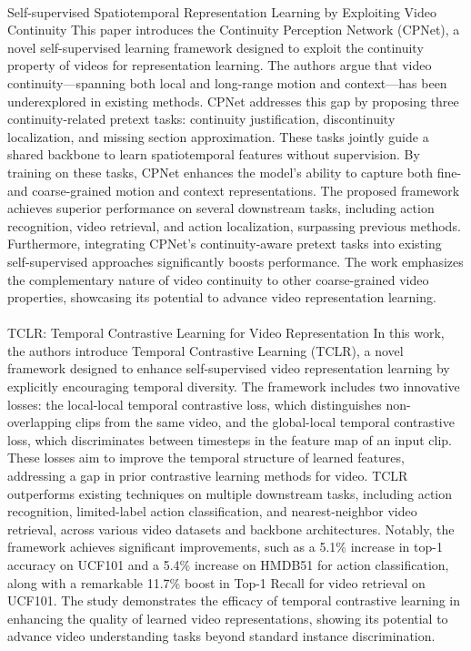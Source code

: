 \documentclass[11pt,a4paper]{report}
\begin{document}
\paragraph{} Self-supervised Spatiotemporal Representation Learning by Exploiting Video Continuity
This paper \cite{Liang2022} introduces the Continuity Perception Network (CPNet), a novel self-supervised learning framework designed to exploit the continuity property of videos for representation learning. The authors argue that video continuity—spanning both local and long-range motion and context—has been underexplored in existing methods. CPNet addresses this gap by proposing three continuity-related pretext tasks: continuity justification, discontinuity localization, and missing section approximation. These tasks jointly guide a shared backbone to learn spatiotemporal features without supervision. By training on these tasks, CPNet enhances the model’s ability to capture both fine- and coarse-grained motion and context representations. The proposed framework achieves superior performance on several downstream tasks, including action recognition, video retrieval, and action localization, surpassing previous methods. Furthermore, integrating CPNet’s continuity-aware pretext tasks into existing self-supervised approaches significantly boosts performance. The work emphasizes the complementary nature of video continuity to other coarse-grained video properties, showcasing its potential to advance video representation learning.

\paragraph{} TCLR: Temporal Contrastive Learning for Video Representation \cite{dave2022tclr}
In this work, the authors introduce Temporal Contrastive Learning (TCLR), a novel framework designed to enhance self-supervised video representation learning by explicitly encouraging temporal diversity. The framework includes two innovative losses: the local-local temporal contrastive loss, which distinguishes non-overlapping clips from the same video, and the global-local temporal contrastive loss, which discriminates between timesteps in the feature map of an input clip. These losses aim to improve the temporal structure of learned features, addressing a gap in prior contrastive learning methods for video. TCLR outperforms existing techniques on multiple downstream tasks, including action recognition, limited-label action classification, and nearest-neighbor video retrieval, across various video datasets and backbone architectures. Notably, the framework achieves significant improvements, such as a 5.1\% increase in top-1 accuracy on UCF101 and a 5.4\% increase on HMDB51 for action classification, along with a remarkable 11.7\% boost in Top-1 Recall for video retrieval on UCF101. The study demonstrates the efficacy of temporal contrastive learning in enhancing the quality of learned video representations, showing its potential to advance video understanding tasks beyond standard instance discrimination.
\end{document}
